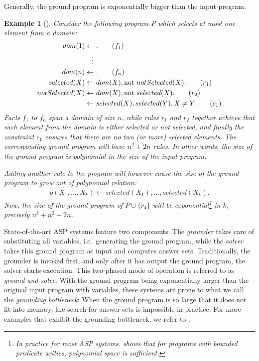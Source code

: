 \documentclass{vutinfth} %
\newtheorem{example}{Example}[chapter]
\newcommand{\fail}{\mathrm{not } \ \xspace}
\newcommand{\from}{\ensuremath{\leftarrow}}
\begin{document}
Generally, the ground program is exponentially bigger than the input program.

\newpage

\begin{example}[{\cite[Example 1]{alpha-techniques}}]
\label{ex:explosion}
Consider the following program $P$ which selects at most one element from a domain:
\begin{align}
dom(1) \from& \ .\tag{$f_1$} \\
\vdots \notag \\
dom(n) \from& \ . \tag{$f_n$} \\
selected(X) \from& \  dom(X), \fail notSelected(X).  \tag{$r_1$} \\
notSelected(X) \from& \  dom(X), \fail selected(X).  \tag{$r_2$} \\
\from& \ selected(X), selected(Y), X \not = Y.  \tag{$c_1$}
\end{align}
Facts $f_1$ to $f_n$ span a domain of size $n$, while rules $r_1$ and $r_2$ together achieve that each element from the domain is either selected or not selected, and finally the constraint $c_1$ ensures that there are no two (or more) selected elements. The corresponding ground program will have $n^2 + 2n$ rules. In other words, the size of the ground program is polynomial in the size of the input program.

Adding another rule to the program will however cause the size of the ground program to grow out of polynomial relation:
\begin{align}p(X_1, \ldots, X_k) \from selected(X_1), \ldots, selected(X_k). \tag{$r_3$} \end{align}
Now, the size of the ground program of $P \cup \{ r_4 \}$ will be exponential\footnote{In practice for most ASP systems. \cite{bounded-arities} shows that for programs with bounded predicate arities, polynomial space is sufficient.} in $k$, precisely $n^k + n^2 + 2n$.
\end{example}

State-of-the-art ASP systems feature two components: The \emph{grounder} takes care of substituting all variables, i.e.~generating the ground program, while the \emph{solver} takes this ground program as input and computes answer sets. Traditionally, the grounder is invoked first, and only after it has output the ground program, the solver starts execution. This two-phased mode of operation is referred to as \emph{ground-and-solve}. With the ground program being exponentially larger than the original input program with variables, these systems are prone to what we call the \emph{grounding bottleneck}: When the ground program is so large that it does not fit into memory, the search for answer sets is impossible in practice. For more examples that exhibit the grounding bottleneck, we refer to \cite[Section 1]{asperix}.
\end{document}
